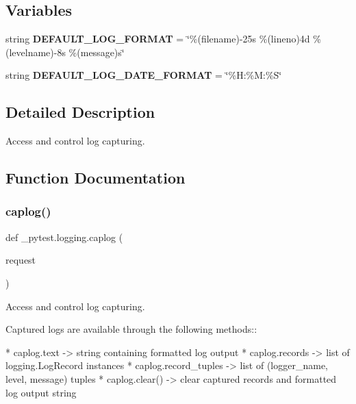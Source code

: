 \subsection*{Variables}
\begin{DoxyCompactItemize}
\item 
\mbox{\label{namespace__pytest_1_1logging_aac22081f033cb036baa5b9c8bf73c00b}} 
string {\bfseries D\+E\+F\+A\+U\+L\+T\+\_\+\+L\+O\+G\+\_\+\+F\+O\+R\+M\+AT} = \char`\"{}\%(filename)-\/25s \%(lineno)4d \%(levelname)-\/8s \%(message)s\char`\"{}
\item 
\mbox{\label{namespace__pytest_1_1logging_ab85524567b9f6a4cb5ff485a431b896c}} 
string {\bfseries D\+E\+F\+A\+U\+L\+T\+\_\+\+L\+O\+G\+\_\+\+D\+A\+T\+E\+\_\+\+F\+O\+R\+M\+AT} = \char`\"{}\%H\+:\%M\+:\%S\char`\"{}
\end{DoxyCompactItemize}


\subsection{Detailed Description}
\begin{DoxyVerb}Access and control log capturing. \end{DoxyVerb}
 

\subsection{Function Documentation}
\mbox{\label{namespace__pytest_1_1logging_ac711b2668a331a9ba457cb6ad56bda10}} 
\subsubsection{\texorpdfstring{caplog()}{caplog()}}
{\footnotesize\ttfamily def \+\_\+pytest.\+logging.\+caplog (\begin{DoxyParamCaption}\item[{}]{request }\end{DoxyParamCaption})}

\begin{DoxyVerb}Access and control log capturing.

Captured logs are available through the following methods::

* caplog.text            -> string containing formatted log output
* caplog.records         -> list of logging.LogRecord instances
* caplog.record_tuples   -> list of (logger_name, level, message) tuples
* caplog.clear()         -> clear captured records and formatted log output string
\end{DoxyVerb}
 \mbox{\label{namespace__pytest_1_1logging_af77c0229b1968dd8184ddb02082c9196}} 
